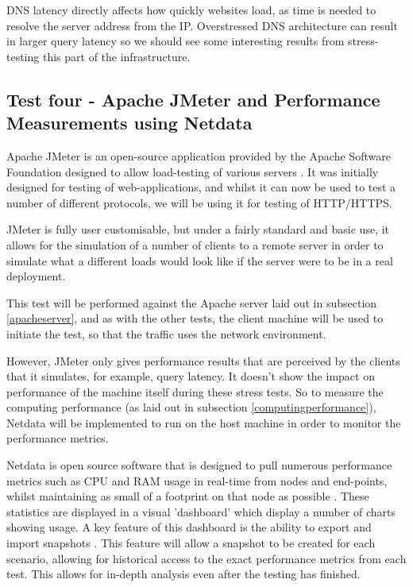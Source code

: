 DNS latency directly affects how quickly websites load, as time is needed to resolve the server address from the IP. Overstressed DNS architecture can result in larger query latency\citep{DNSlatency} so we should see some interesting results from stress-testing this part of the infrastructure.

\subsection{Test four - Apache JMeter and Performance Measurements using Netdata}
Apache JMeter is an open-source application provided by the Apache Software Foundation designed to allow load-testing of various servers \citep{ApacheJMeter}. It was initially designed for testing of web-applications, and whilst it can now be used to test a number of different protocols, we will be using it for testing of HTTP/HTTPS.

JMeter is fully user customisable, but under a fairly standard and basic use, it allows for the simulation of a number of clients to a remote server in order to simulate what a different loads would look like if the server were to be in a real deployment\citep{masterjmeter}.

This test will be performed against the Apache server laid out in subsection \ref{apacheserver}, and as with the other tests, the client machine will be used to initiate the test, so that the traffic uses the network environment.

However, JMeter only gives performance results that are perceived by the clients that it simulates, for example, query latency. It doesn't show the impact on performance of the machine itself during these stress tests. So to measure the computing performance (as laid out in subsection \ref{computingperformance}), Netdata will be implemented to run on the host machine in order to monitor the performance metrics.

Netdata is open source software that is designed to pull numerous performance metrics such as CPU and RAM usage in real-time from nodes and end-points, whilst maintaining as small of a footprint on that node as possible \citep{Netdata}. These statistics are displayed in a visual 'dashboard' which display a number of charts showing usage. A key feature of this dashboard is the ability to export and import snapshots \citep{netdatadashboard}. This feature will allow a snapshot to be created for each scenario, allowing for historical access to the exact performance metrics from each test. This allows for in-depth analysis even after the testing has finished.